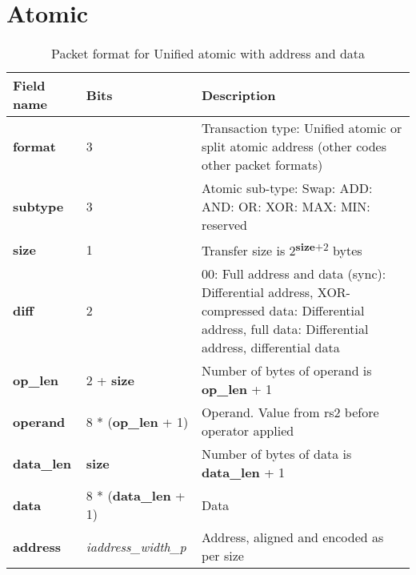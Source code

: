 \FloatBarrier
\section{Atomic} \label{sec:data-atomic}

\begin{table}[htp]
  \centering
  \caption{Packet format for Unified atomic with address and data}
  \label{tab:te_datadx0y5}
  \begin{tabulary}{\textwidth}{|l|p{40mm}|p{90mm}|}
    \hline
    {\bf Field name} & {\bf Bits} & {\bf Description} \\
    \hline
    \textbf{format} & 	3	& Transaction type: Unified atomic or split atomic address\newline	
		(other codes other packet formats)\\
    \hline
    \textbf{subtype} & 	3	& Atomic sub-type: Swap: ADD: AND: OR: XOR: MAX: MIN: reserved\\	

    \hline
    \textbf{size} & 1 & Transfer size is 2\textsuperscript{\textbf{size}+2} bytes\\
    \hline
    \textbf{diff} & 2 & 00: Full address and data (sync): Differential address, XOR-compressed data: Differential address, full data: Differential address, differential data\\
    \hline
    \textbf{op\_len} & 2 + \textbf{size} &	Number of bytes of operand is \textbf{op\_len} + 1\\
    \hline
    \textbf{operand}	& 8 * (\textbf{op\_len} + 1) & Operand.  Value from rs2 before operator applied\\
    \hline
    \textbf{data\_len}	& \textbf{size} & Number of bytes of data is \textbf{data\_len} + 1\\
    \hline
    \textbf{data} & 8 * (\textbf{data\_len} + 1) & 
                Data\\
    \hline
    \textbf{address} &  \textit{iaddress\_width\_p} & Address, aligned and encoded as per size \\
    \hline
  \end{tabulary}
\end{table}

